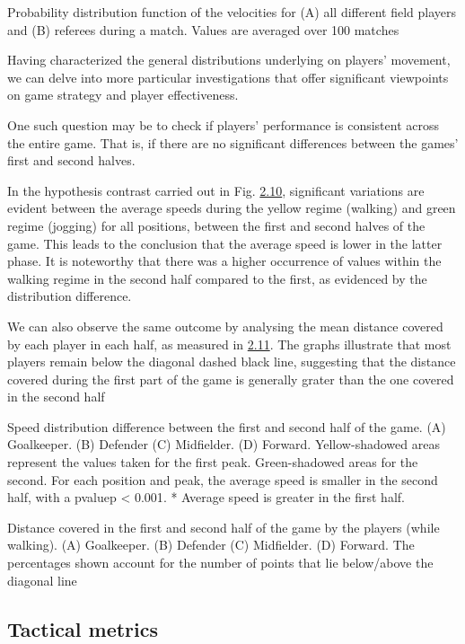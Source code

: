 \documentclass[twoside,nohyper]{tufte-book}
\begin{document}
Probability distribution function of the velocities for
(A) all different field players and
(B) referees during a match. Values are averaged over
{100} matches

Having characterized the general distributions underlying on players'
movement, we can delve into more particular investigations that offer
significant viewpoints on game strategy and player effectiveness.

One such question may be to check if players' performance is consistent
across the entire game. That is, if there are no significant differences
between the games' first and second halves.

In the hypothesis contrast carried out in Fig.
\protect\hyperlink{f2.10}{2.10}, significant
variations are evident between the average speeds during the yellow
regime (walking) and green regime (jogging) for all positions, between
the first and second halves of the game. This leads to the conclusion
that the average speed is lower in the latter phase. It is noteworthy
that there was a higher occurrence of values within the walking regime
in the second half compared to the first, as evidenced by the
distribution difference.

We can also observe the same outcome by analysing the mean distance
covered by each player in each half, as measured in
\protect\hyperlink{f2.11}{2.11}. The graphs
illustrate that most players remain below the diagonal dashed black
line, suggesting that the distance covered during the first part of the
game is generally grater than the one covered in the second half

Speed distribution difference between the first and second
half of the game. (A) Goalkeeper. (B)
Defender (C) Midfielder. (D) Forward.
Yellow-shadowed areas represent the values taken for the first peak.
Green-shadowed areas for the second. For each position and peak, the
average speed is smaller in the second half, with a {pvaluep \textless{} 0.001}.
* Average speed is greater in the first
half.

Distance covered in the first and second half of the game
by the players (while walking). (A) Goalkeeper.
(B) Defender (C) Midfielder.
(D) Forward. The percentages shown account for the
number of points that lie below/above the diagonal line

\hypertarget{tactical-metrics}{%
\subsection{Tactical metrics}\label{tactical-metrics}}
\end{document}
